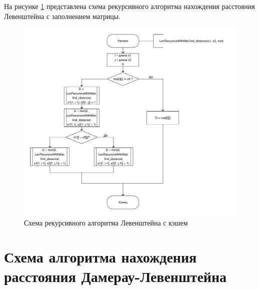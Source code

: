 \documentclass[a4paper,oneside,14pt]{extreport}
\begin{document}
На рисунке \ref{fig:recur_lev_mat} представлена схема рекурсивного алгоритма нахождения расстояния Левенштейна с заполнением матрицы.
\begin{figure}[H]
	\centering
	\includegraphics[width=1.07\linewidth, height=1.2\linewidth]{images/recursLevenshtainMat}
	\caption{Схема рекурсивного алгоритма Левенштейна с кэшем}
	\label{fig:recur_lev_mat}
\end{figure}

\section{Схема алгоритма нахождения расстояния Дамерау-Левенштейна}
\end{document}
